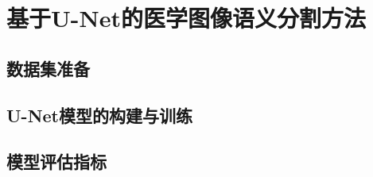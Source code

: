 \section{基于U-Net的医学图像语义分割方法}

\subsection{数据集准备}


\subsection{U-Net模型的构建与训练}


\subsection{模型评估指标}
